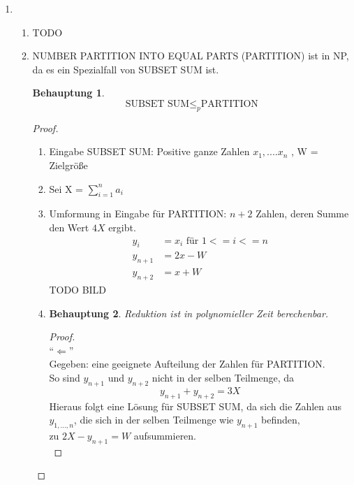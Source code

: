 \documentclass[a4paper]{scrartcl}
\newtheorem*{proposition}{Behauptung}
\begin{document}
\begin{enumerate}[label=\bfseries \arabic*.]
\item %
\begin{enumerate}
    \item %
        TODO
    \item %
     NUMBER PARTITION INTO EQUAL PARTS (PARTITION) ist in NP, da es ein Spezialfall von SUBSET SUM ist.
    \begin{proposition}
        \[ \text{SUBSET SUM} \leq_{p} \text{PARTITION} \]
    \end{proposition}
    \begin{proof}
        \hfill \\
        \begin{enumerate}
            \item Eingabe SUBSET SUM: Positive ganze Zahlen $x_1, .... x_n$ , W = Zielgröße
            \item Sei X = $\sum_{i=1}^{n} a_i $
            \item Umformung in Eingabe für PARTITION: $n + 2$ Zahlen, deren Summe den Wert $4X$ ergibt.\\ 
            \begin{align*}
                y_i &= x_i \text{ für } 1 <= i <= n \\
                y_{n+1} &= 2x - W \\
                y_{n+2} &= x + W
            \end{align*}
            TODO BILD %

            \item
                \begin{proposition}
                Reduktion ist in polynomieller Zeit berechenbar.
                \end{proposition}
                \begin{proof}
                    \hfill \\
                    ``$\Leftarrow$'' \\
                    Gegeben: eine geeignete Aufteilung der Zahlen für PARTITION.\\
                    So sind $y_{n+1}$ und $y_{n+2}$ nicht in der selben Teilmenge, da
                    $$y_{n+1} + y_{n+2} = 3X$$
                    Hieraus folgt eine Lösung für SUBSET SUM, da sich die Zahlen aus $y_{1,...,n}$,
                    die sich in der selben Teilmenge wie $y_{n+1}$ befinden, \\
                    zu $2X - y_{n+1} = W$ aufsummieren. \\


\end{proof}
\end{enumerate}
\end{proof}
\end{enumerate}
\end{enumerate}
\end{document}
